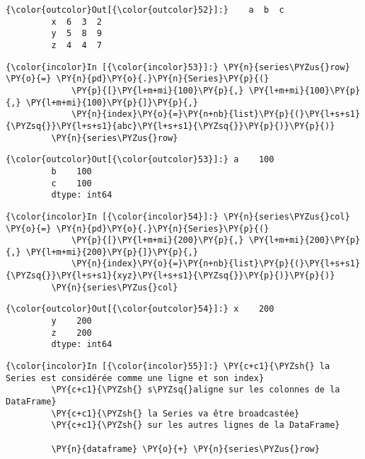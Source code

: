 \begin{Verbatim}[commandchars=\\\{\},frame=single,framerule=0.3mm,rulecolor=\color{cellframecolor}]
{\color{outcolor}Out[{\color{outcolor}52}]:}    a  b  c
         x  6  3  2
         y  5  8  9
         z  4  4  7
\end{Verbatim}
            
    \begin{Verbatim}[commandchars=\\\{\},frame=single,framerule=0.3mm,rulecolor=\color{cellframecolor}]
{\color{incolor}In [{\color{incolor}53}]:} \PY{n}{series\PYZus{}row} \PY{o}{=} \PY{n}{pd}\PY{o}{.}\PY{n}{Series}\PY{p}{(}
             \PY{p}{[}\PY{l+m+mi}{100}\PY{p}{,} \PY{l+m+mi}{100}\PY{p}{,} \PY{l+m+mi}{100}\PY{p}{]}\PY{p}{,}
             \PY{n}{index}\PY{o}{=}\PY{n+nb}{list}\PY{p}{(}\PY{l+s+s1}{\PYZsq{}}\PY{l+s+s1}{abc}\PY{l+s+s1}{\PYZsq{}}\PY{p}{)}\PY{p}{)}
         \PY{n}{series\PYZus{}row}
\end{Verbatim}


\begin{Verbatim}[commandchars=\\\{\},frame=single,framerule=0.3mm,rulecolor=\color{cellframecolor}]
{\color{outcolor}Out[{\color{outcolor}53}]:} a    100
         b    100
         c    100
         dtype: int64
\end{Verbatim}
            
    \begin{Verbatim}[commandchars=\\\{\},frame=single,framerule=0.3mm,rulecolor=\color{cellframecolor}]
{\color{incolor}In [{\color{incolor}54}]:} \PY{n}{series\PYZus{}col} \PY{o}{=} \PY{n}{pd}\PY{o}{.}\PY{n}{Series}\PY{p}{(}
             \PY{p}{[}\PY{l+m+mi}{200}\PY{p}{,} \PY{l+m+mi}{200}\PY{p}{,} \PY{l+m+mi}{200}\PY{p}{]}\PY{p}{,}
             \PY{n}{index}\PY{o}{=}\PY{n+nb}{list}\PY{p}{(}\PY{l+s+s1}{\PYZsq{}}\PY{l+s+s1}{xyz}\PY{l+s+s1}{\PYZsq{}}\PY{p}{)}\PY{p}{)}
         \PY{n}{series\PYZus{}col}
\end{Verbatim}


\begin{Verbatim}[commandchars=\\\{\},frame=single,framerule=0.3mm,rulecolor=\color{cellframecolor}]
{\color{outcolor}Out[{\color{outcolor}54}]:} x    200
         y    200
         z    200
         dtype: int64
\end{Verbatim}
            
    \begin{Verbatim}[commandchars=\\\{\},frame=single,framerule=0.3mm,rulecolor=\color{cellframecolor}]
{\color{incolor}In [{\color{incolor}55}]:} \PY{c+c1}{\PYZsh{} la Series est considérée comme une ligne et son index}
         \PY{c+c1}{\PYZsh{} s\PYZsq{}aligne sur les colonnes de la DataFrame}
         \PY{c+c1}{\PYZsh{} la Series va être broadcastée}
         \PY{c+c1}{\PYZsh{} sur les autres lignes de la DataFrame}
         
         \PY{n}{dataframe} \PY{o}{+} \PY{n}{series\PYZus{}row}
\end{Verbatim}


